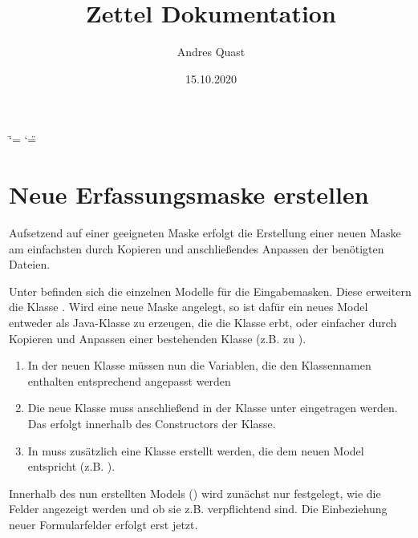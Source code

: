 \documentclass[letterpaper,10pt,ngerman]{sphinxmanual}
\title{Zettel Dokumentation}
\date{15.10.2020}
\author{Andres Quast}
\begin{document}
\ifdefined\shorthandoff
  \ifnum\catcode`\=\string=\active\shorthandoff{=}\fi
  \ifnum\catcode`\"=\active{}\fi
\fi
\maketitle
\sphinxtableofcontents
{}\label{\detokenize{index::doc}}



\chapter{Neue Erfassungsmaske erstellen}
\label{\detokenize{developer-docs/createNewFormMask:neue-erfassungsmaske-erstellen}}\label{\detokenize{developer-docs/createNewFormMask::doc}}
Aufsetzend auf einer geeigneten Maske erfolgt die Erstellung einer neuen Maske am einfachsten durch Kopieren und  anschließendes Anpassen der benötigten Dateien.

Unter  befinden sich die einzelnen Modelle für die Eingabemasken. Diese erweitern die Klasse .
Wird eine neue Maske angelegt, so ist dafür ein neues Model entweder als Java-Klasse zu erzeugen, die die Klasse  erbt,
oder einfacher durch Kopieren und Anpassen einer bestehenden Klasse (z.B.  zu ).
\begin{enumerate}
\item {} 
In der neuen Klasse müssen nun die Variablen, die den Klassennamen enthalten entsprechend angepasst werden

\item {} 
Die neue Klasse muss anschließend in der Klasse  unter  eingetragen werden. Das erfolgt innerhalb des Constructors der Klasse.

\item {} 
In  muss zusätzlich eine Klasse erstellt werden, die dem neuen Model entspricht (z.B. ).

\end{enumerate}

Innerhalb des nun erstellten Models () wird zunächst nur festgelegt, wie die Felder angezeigt werden und ob sie z.B. verpflichtend sind.
Die Einbeziehung neuer Formularfelder erfolgt erst jetzt.
\end{document}
